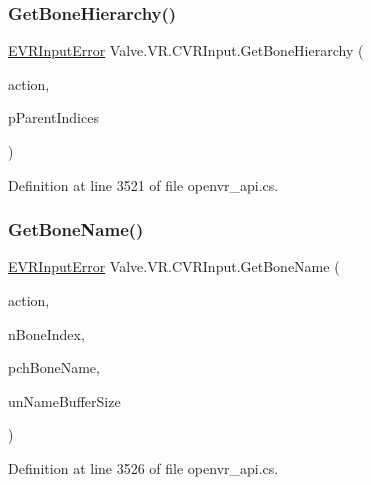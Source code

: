 \mbox{\label{class_valve_1_1_v_r_1_1_c_v_r_input_aa466cccf4a5febf36c4a380d65efe898}} 
\subsubsection{\texorpdfstring{GetBoneHierarchy()}{GetBoneHierarchy()}}
{\footnotesize\ttfamily \mbox{\hyperlink{namespace_valve_1_1_v_r_a592d7f4189b8346d6c96dbdbaa35bc1b}{E\+V\+R\+Input\+Error}} Valve.\+V\+R.\+C\+V\+R\+Input.\+Get\+Bone\+Hierarchy (\begin{DoxyParamCaption}\item[{ulong}]{action,  }\item[{int \mbox{[}$\,$\mbox{]}}]{p\+Parent\+Indices }\end{DoxyParamCaption})}



Definition at line 3521 of file openvr\+\_\+api.\+cs.

\mbox{\label{class_valve_1_1_v_r_1_1_c_v_r_input_a5070c6028a318616089fec51e137b930}} 
\subsubsection{\texorpdfstring{GetBoneName()}{GetBoneName()}}
{\footnotesize\ttfamily \mbox{\hyperlink{namespace_valve_1_1_v_r_a592d7f4189b8346d6c96dbdbaa35bc1b}{E\+V\+R\+Input\+Error}} Valve.\+V\+R.\+C\+V\+R\+Input.\+Get\+Bone\+Name (\begin{DoxyParamCaption}\item[{ulong}]{action,  }\item[{int}]{n\+Bone\+Index,  }\item[{System.\+Text.\+String\+Builder}]{pch\+Bone\+Name,  }\item[{uint}]{un\+Name\+Buffer\+Size }\end{DoxyParamCaption})}



Definition at line 3526 of file openvr\+\_\+api.\+cs.

\mbox{\label{class_valve_1_1_v_r_1_1_c_v_r_input_a1b3a25ef4577dfeed2d75eb81424bd5b}} 
